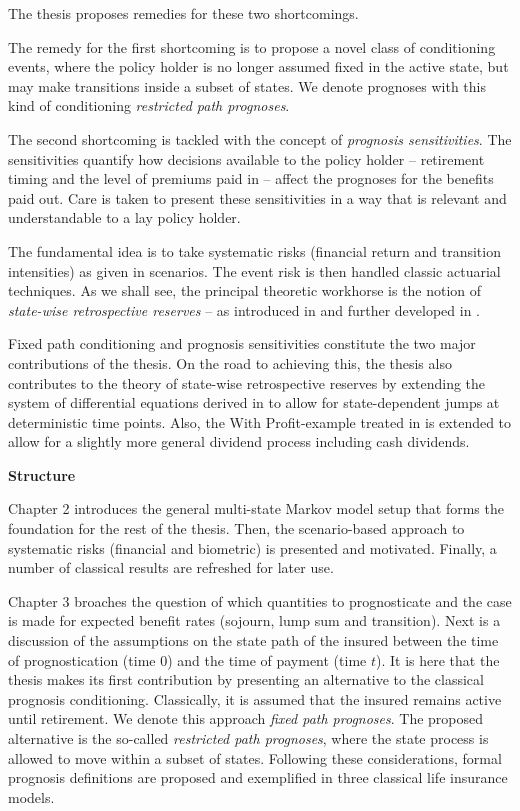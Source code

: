 \documentclass{article}
\newcommand{\1}[1]{\mathbbm{1}_{\left\lbrace #1 \right\rbrace}}
\theoremstyle{break}
\theoremstyle{remark}
\numberwithin{equation}{section}
\begin{document}
The thesis proposes remedies for these two shortcomings.

The remedy for the first shortcoming is to propose a novel class of conditioning events, where the policy holder is no longer assumed fixed in the active state, but may make transitions inside a subset of states. We denote prognoses with this kind of conditioning \textit{restricted path prognoses}.

The second shortcoming is tackled with the concept of \textit{prognosis sensitivities}. The sensitivities quantify how decisions available to the policy holder -- retirement timing and the level of premiums paid in -- affect the prognoses for the benefits paid out. Care is taken to present these sensitivities in a way that is relevant and understandable to a lay policy holder.

The fundamental idea is to take systematic risks (financial return and transition intensities) as given in scenarios. The event risk is then handled classic actuarial techniques. As we shall see, the principal theoretic workhorse is the notion of \textit{state-wise retrospective reserves} -- as introduced in \cite{Norberg1991} and further developed in \cite{Lollike}.

Fixed path conditioning and prognosis sensitivities constitute the two major contributions of the thesis. On the road to achieving this, the thesis also contributes to the theory of state-wise retrospective reserves by extending the system of differential equations derived in \cite{Lollike} to allow for state-dependent jumps at deterministic time points. Also, the With Profit-example treated in \cite{Lollike} is extended to allow for a slightly more general dividend process including cash dividends.

\textbf{Structure}

Chapter 2 introduces the general multi-state Markov model setup that forms the foundation for the rest of the thesis. Then, the scenario-based approach to systematic risks (financial and biometric) is presented and motivated. Finally, a number of classical results are refreshed for later use.

Chapter 3 broaches the question of which quantities to prognosticate and the case is made for expected benefit rates (sojourn, lump sum and transition). Next is a discussion of the assumptions on the state path of the insured between the time of prognostication (time 0) and the time of payment (time $t$). It is here that the thesis makes its first contribution by presenting an alternative to the classical prognosis conditioning. Classically, it is assumed that the insured remains active until retirement. We denote this approach \textit{fixed path prognoses}. The proposed alternative is the so-called \textit{restricted path prognoses}, where the state process is allowed to move within a subset of states. Following these considerations, formal prognosis definitions are proposed and exemplified in three classical life insurance models.
\end{document}
